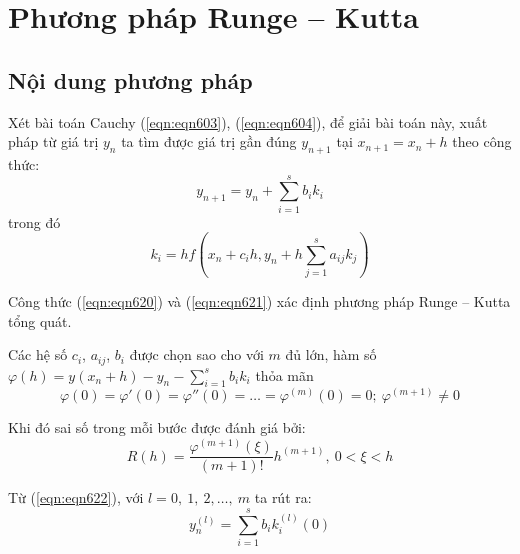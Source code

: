 \section{Phương pháp Runge – Kutta}
\subsection{Nội dung phương pháp}

Xét bài toán Cauchy (\ref{eqn:eqn603}), (\ref{eqn:eqn604}), để giải bài toán này, xuất pháp từ giá trị $y_n$ ta tìm được giá trị gần đúng $y_{n+1}$ tại $x_{n+1}=x_n + h$ theo công thức:\\
\begin{equation}\label{eqn:eqn620}
	y_{n+1}=y_n+\sum\limits_{i=1}^s b_i k_i
\end{equation}
trong đó\\
\begin{equation}\label{eqn:eqn621}
	k_i=hf\left(x_n+c_ih, y_n+h\sum\limits_{j=1}^s a_{ij} k_j\right)
\end{equation}

Công thức (\ref{eqn:eqn620}) và (\ref{eqn:eqn621}) xác định phương pháp Runge – Kutta tổng quát.\par

Các hệ số $c_i$, $a_{ij}$, $b_i$ được chọn sao cho với $m$ đủ lớn, hàm số $\varphi(h)=y(x_n+h)-y_n-\sum\limits_{i=1}^s b_i k_i$ thỏa mãn
\begin{equation}\label{eqn:eqn622}
	\varphi(0)=\varphi'(0)=\varphi''(0)=\ldots=\varphi^{(m)}(0)=0;~\varphi^{(m+1)}\neq 0
\end{equation}

Khi đó sai số trong mỗi bước được đánh giá bởi:\\
\begin{equation}\label{eqn:eqn623}
	R(h)=\frac{\varphi^{(m+1)} \left(\xi\right)}{(m+1)!}h^{(m+1)},~0<\xi<h
\end{equation}

Từ (\ref{eqn:eqn622}), với $l=0,~1,~2,\ldots,~m$ ta rút ra:
\begin{equation}\label{eqn:eqn624}
	y^{(l)}_n=\sum\limits_{i=1}^s b_i k^{(l)}_i (0)
\end{equation}

